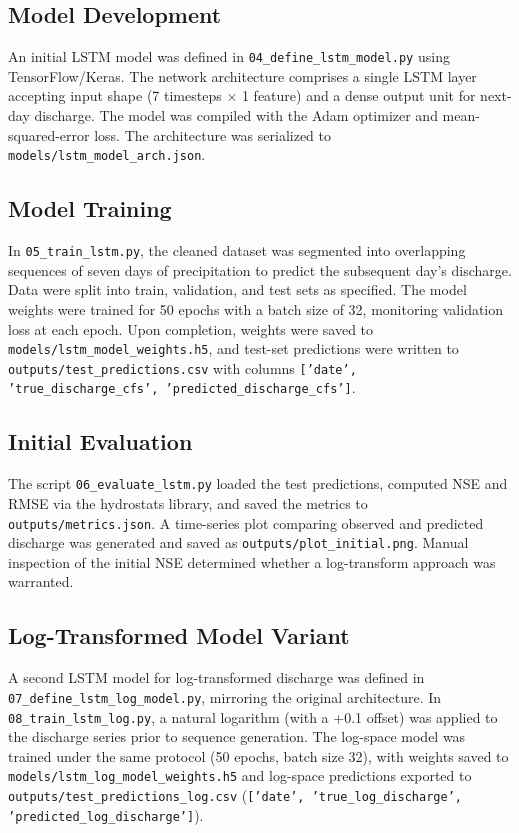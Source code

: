 \documentclass[preprint,12pt]{elsarticle}
\begin{document}
\subsection{Model Development}
An initial LSTM model was defined in \texttt{04\_define\_lstm\_model.py} using TensorFlow/Keras. The network architecture comprises a single LSTM layer accepting input shape (7 timesteps × 1 feature) and a dense output unit for next-day discharge. The model was compiled with the Adam optimizer and mean-squared-error loss. The architecture was serialized to \texttt{models/lstm\_model\_arch.json}.

\subsection{Model Training}
In \texttt{05\_train\_lstm.py}, the cleaned dataset was segmented into overlapping sequences of seven days of precipitation to predict the subsequent day's discharge. Data were split into train, validation, and test sets as specified. The model weights were trained for 50 epochs with a batch size of 32, monitoring validation loss at each epoch. Upon completion, weights were saved to \texttt{models/lstm\_model\_weights.h5}, and test-set predictions were written to \texttt{outputs/test\_predictions.csv} with columns \texttt{['date', 'true\_discharge\_cfs', 'predicted\_discharge\_cfs']}.

\subsection{Initial Evaluation}
The script \texttt{06\_evaluate\_lstm.py} loaded the test predictions, computed NSE and RMSE via the hydrostats library, and saved the metrics to \texttt{outputs/metrics.json}. A time-series plot comparing observed and predicted discharge was generated and saved as \texttt{outputs/plot\_initial.png}. Manual inspection of the initial NSE determined whether a log-transform approach was warranted.

\subsection{Log-Transformed Model Variant}
A second LSTM model for log-transformed discharge was defined in \texttt{07\_define\_lstm\_log\_model.py}, mirroring the original architecture. In \texttt{08\_train\_lstm\_log.py}, a natural logarithm (with a +0.1 offset) was applied to the discharge series prior to sequence generation. The log-space model was trained under the same protocol (50 epochs, batch size 32), with weights saved to \texttt{models/lstm\_log\_model\_weights.h5} and log-space predictions exported to \texttt{outputs/test\_predictions\_log.csv} (\texttt{['date', 'true\_log\_discharge', 'predicted\_log\_discharge']}).
\end{document}
